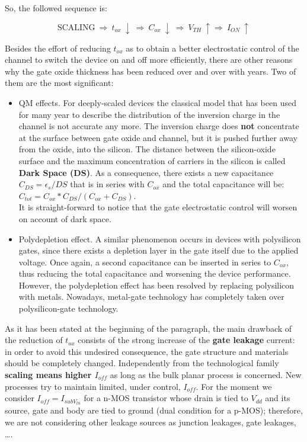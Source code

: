 \documentclass[a4paper, 12pt, twoside, openright]{report}
\begin{document}
So, the followed sequence is:

\begin{equation}
\text{SCALING} \ \Rightarrow \ t_{ox} \ \downarrow \ \Rightarrow \ C_{ox} \ \downarrow \ \Rightarrow \ V_{TH} \ \uparrow \Rightarrow \ I_{ON} \ \uparrow
\end{equation}

Besides the effort of reducing $t_{ox}$ as to obtain a better electrostatic control of the channel to switch the device on and off more efficiently, there are other reasons why the gate oxide thickness has been reduced over and over with years. Two of them are the most significant:

\begin{itemize}
\item QM effects. For deeply-scaled devices the classical model that has been used for many year to describe the distribution of the inversion charge in the channel is not accurate any more. The inversion charge does \textbf{not} concentrate at the surface between gate oxide and channel, but it is pushed further away from the oxide, into the silicon. The distance between the silicon-oxide surface and the maximum concentration of carriers in the silicon is called \textbf{Dark Space (DS)}. As a consequence, there exists a new capacitance $C_{DS}=\epsilon_{s}/ DS$ that is in series with $C_{ox}$ and the total capacitance will be: \\ $C_{tot}=C_{ox}*C_{DS}/(C_{ox}+C_{DS})$.\\ It is straight-forward to notice that the gate electrostatic control will worsen on account of dark space.
\item Polydepletion effect. A similar phenomenon occurs in devices with polysilicon gates, since there exists a depletion layer in the gate itself due to the applied voltage. Once again, a second capacitance can be inserted in series to $C_{ox}$, thus reducing the total capacitance and worsening the device performance. However, the polydepletion effect has been resolved by replacing polysilicon with metals. Nowadays, metal-gate technology has completely taken over polysilicon-gate technology.
\end{itemize} 

As it has been stated at the beginning of the paragraph, the main drawback of the reduction of $t_{ox}$ consists of the strong increase of the \textbf{gate leakage} current: in order to avoid this undesired consequence, the gate structure and materials should be completely changed. Independently from the technological family \textbf{scaling means higher $I_{off}$} as long as the bulk planar process is concerned. New processes try to maintain limited, under control, $I_{off}$. For the moment we consider $I_{off}=I_{subV_{th}}$ for a n-MOS transistor whose drain is tied to $V_{dd}$ and its source, gate and body are tied to ground (dual condition for a p-MOS)\label{ioff_config}; therefore, we are not considering other leakage sources as junction leakages, gate leakages, \dots.
\end{document}
